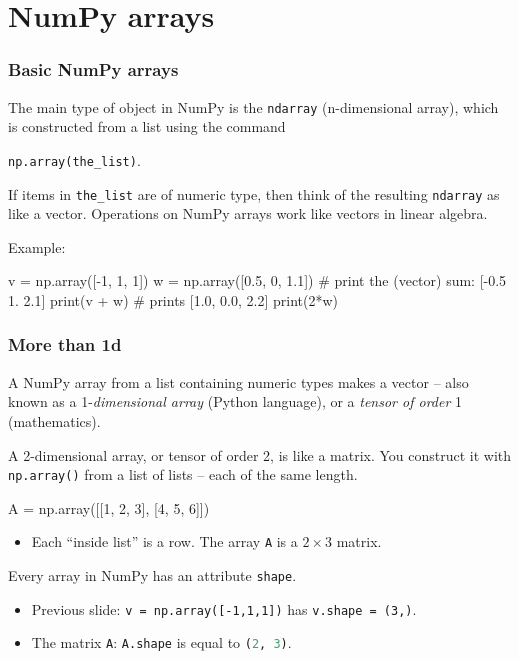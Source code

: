 \documentclass{beamer}
\newenvironment{codeblock}
    {\hfill\begin{beamerboxesrounded}[lower=codecol, width=0.8\textwidth]
    \medskip

    }
    { 
    \end{beamerboxesrounded}\hfill
    }
\theoremstyle{example}
\newcommand{\ct}[1]{\lstinline[language=Python]!#1!}
\newcommand{\ttt}[1]{{\small\texttt{#1}}}
\begin{document}
\section{NumPy arrays}
\begin{frame}[fragile]
\frametitle{Basic NumPy arrays}
The main type of object in NumPy is the \ttt{ndarray} (n-dimensional array), which is constructed from a list using the command 
\begin{center}\ttt{np.array(the}\ct{_}\ttt{list)}.\end{center}

\vspace*{12pt}
\pause
If items in \ttt{the}\ct{_}\ttt{list} are of numeric type, then think of the resulting \ttt{ndarray} as like a vector. Operations on NumPy arrays work like vectors in linear algebra.
\vspace*{12pt}

\pause
Example:

\begin{codeblock}

\begin{python}
v = np.array([-1, 1, 1])
w = np.array([0.5, 0, 1.1])
# print the (vector) sum: [-0.5  1.   2.1]
print(v + w)
# prints [1.0, 0.0, 2.2]
print(2*w)
\end{python}

\end{codeblock}

\end{frame}

\begin{frame}[fragile]
\frametitle{More than {\ttm 1d}}
A NumPy array from a list containing numeric types makes a vector {--} also known as a 1-\emph{dimensional array} (Python language), or a \emph{tensor of order} 1 (mathematics). 

\pause
A 2-dimensional array, or tensor of order 2, is like a matrix. You construct it with \ttt{np.array()} from a list of lists {--} each of the same length.

\begin{codeblock}

\begin{python}[numbers=none]
A = np.array([[1, 2, 3], [4, 5, 6]])
\end{python}

\end{codeblock}

\begin{itemize}
    \item[] Each ``inside list'' is a row. The array \ttt{A} is a $2\times 3$ matrix.
\end{itemize}

\pause
Every array in NumPy has an attribute \ttt{shape}. 
\begin{itemize}
    \item Previous slide: \ttt{v = np.array([-1,1,1])} has \ttt{v.shape = (3,)}. 
    \item The matrix \ttt{A}: \ttt{A.shape} is equal to \ct{(2, 3)}.
\end{itemize}
\end{frame}
\end{document}
